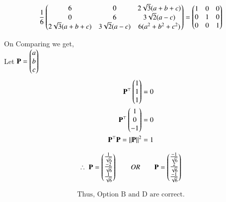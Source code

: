 \documentclass[journal]{IEEEtran}
\begin{document}
\begin{equation}
    \dfrac{1}{6} \begin{pmatrix}6 & 0 & 2\sqrt{3}(a+b+c) \\ 0 & 6 & 3\sqrt{2}(a-c) \\ 2\sqrt{3}(a+b+c) & 3\sqrt{2}(a-c) & 6(a^2 + b^2 + c^2)\end{pmatrix} = \begin{pmatrix}1 & 0 & 0 \\ 0 & 1 & 0 \\ 0 & 0 & 1\end{pmatrix}
\end{equation}

\newpage

On Comparing we get,\\
Let $\mathbf{P} = \begin{pmatrix}a \\ b \\c\end{pmatrix}$
\begin{align}
\mathbf{P}^\top\begin{pmatrix}1 \\ 1 \\ 1\end{pmatrix} &= 0\\
\mathbf{P}^\top\begin{pmatrix}1 \\ 0 \\ -1\end{pmatrix} &= 0\\
\mathbf{P}^\top\mathbf{P} = \left\lVert\mathbf{P}\right\rVert^2 &=  1
\end{align}

\begin{align}
    \therefore \; \mathbf{P} = \begin{pmatrix}\frac{1}{\sqrt{6}} \\ \frac{-2}{\sqrt{6}} \\ \frac{1}{\sqrt{6}}\end{pmatrix} 
     \qquad OR \qquad
    \mathbf{P} = \begin{pmatrix}\frac{-1}{\sqrt{6}} \\ \frac{2}{\sqrt{6}} \\ \frac{-1}{\sqrt{6}}\end{pmatrix}
    \end{align}

\begin{align*}
    \boxed{\text{Thus, Option B and D are correct.}}
\end{align*}
\end{document}
